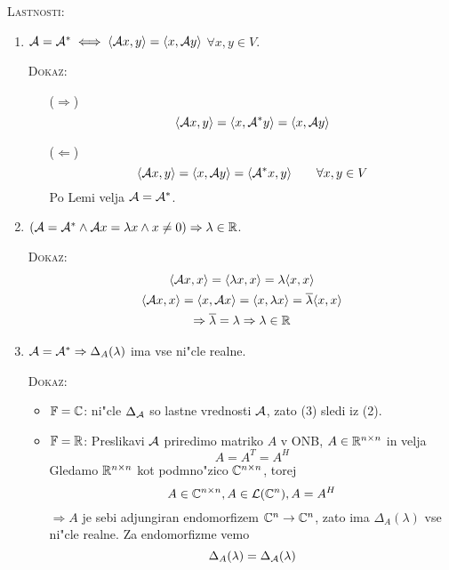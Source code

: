 \textsc{Lastnosti:}
\begin{enumerate}
    \item $\mathcal{A} = \mathcal{A}^* \iff \langle \mathcal{A} x, y \rangle = \langle x, \mathcal{A} y \rangle$ \hfill $\forall x, y \in V$.
    
    \textsc{Dokaz:}
    \begin{itemize}
        \item[($\Rightarrow$)]
        \begin{equation*}
        \langle \mathcal{A} x, y \rangle = \langle x, \mathcal{A}^* y \rangle = \langle x, \mathcal{A} y \rangle
        \end{equation*}
        
        \item[($\Leftarrow$)]
        \begin{equation*}
        \langle \mathcal{A} x, y \rangle = \langle x, \mathcal{A} y \rangle = \langle \mathcal{A}^* x, y \rangle \qquad \forall x, y \in V
        \end{equation*}
        Po Lemi velja $\mathcal{A} = \mathcal{A}^*$.
    \end{itemize}

    \item $(\mathcal{A} = \mathcal{A}^* \land \mathcal{A} x = \lambda x \land x \neq 0) \Rightarrow \lambda \in \mathbb{R}$.
    
    \textsc{Dokaz:}
    \begin{gather*}
    \langle \mathcal{A} x, x \rangle = \langle \lambda x, x \rangle  = \lambda \langle x, x \rangle \\
    \langle \mathcal{A} x, x \rangle = \langle x, \mathcal{A} x \rangle = \langle x, \lambda x \rangle = \overline{\lambda} \langle x, x \rangle \\
    \Rightarrow \overline{\lambda} = \lambda \Rightarrow \lambda \in \mathbb{R}
    \end{gather*}
    
    \item $\mathcal{A} = \mathcal{A}^* \Rightarrow \Delta_A(\lambda)$ ima vse ni"cle realne.
    
    \textsc{Dokaz:}
    \begin{itemize}
        \item $\operatorname{\mathbb{F}} = \mathbb{C}$: ni"cle $\Delta_{\mathcal{A}}$ so lastne vrednosti $\mathcal{A}$, zato (3) sledi iz (2).
        \item $\operatorname{\mathbb{F}} = \mathbb{R}$: Preslikavi $\mathcal{A}$ priredimo matriko $A$ v ONB, $A \in \mathbb{R}^{n \times n}$ in velja
        \begin{equation*}
        A = A^T = A^H
        \end{equation*}
        Gledamo $\mathbb{R}^{n \times n}$ kot podmno"zico $\mathbb{C}^{n \times n}$, torej
        \begin{equation*}
        A \in \mathbb{C}^{n \times n}, A \in \mathcal{L}(\mathbb{C}^n), A = A^H
        \end{equation*}
        $\Rightarrow A$ je sebi adjungiran endomorfizem $\mathbb{C}^n \to \mathbb{C}^n$, zato ima $\Delta_A(\lambda)$ vse ni"cle realne. Za endomorfizme vemo
        \begin{equation*}
        \Delta_A(\lambda) = \Delta_{\mathcal{A}}(\lambda)
        \end{equation*}
    \end{itemize}
\end{enumerate}

